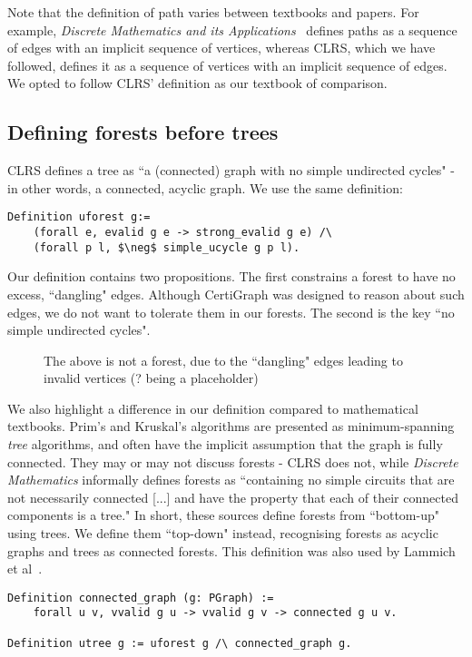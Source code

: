 Note that the definition of path varies between textbooks and papers. For example, \textit{Discrete Mathematics and its Applications}~\cite{rozen} defines paths as a sequence of edges with an implicit sequence of vertices, whereas CLRS, which we have followed, defines it as a sequence of vertices with an implicit sequence of edges. We opted to follow CLRS' definition as our textbook of comparison.

\subsection{Defining forests before trees}

CLRS defines a tree as ``a (connected) graph with no simple undirected cycles" - in other words, a connected, acyclic graph. We use the same definition:
\begin{lstlisting}
Definition uforest g:=
	(forall e, evalid g e -> strong_evalid g e) /\
	(forall p l, $\neg$ simple_ucycle g p l).
\end{lstlisting}
Our definition contains two propositions. The first constrains a forest to have no excess, ``dangling" edges. Although CertiGraph was designed to reason about such edges, we do not want to tolerate them in our forests. The second is the key ``no simple undirected cycles".
\begin{figure}[H]
	\caption{The above is not a forest, due to the ``dangling" edges leading to invalid vertices (? being a placeholder)}
\end{figure}
We also highlight a difference in our definition compared to mathematical textbooks. Prim's and Kruskal's algorithms are presented as minimum-spanning \textit{tree} algorithms, and often have the implicit assumption that the graph is fully connected. They may or may not discuss forests - CLRS does not, while \textit{Discrete Mathematics} informally defines forests as ``containing no simple circuits that are not necessarily connected [...] and have the property that each of their connected components is a tree." In short, these sources define forests from ``bottom-up" using trees. We define them ``top-down" instead, recognising forests as acyclic graphs and trees as connected forests. This definition was also used by Lammich et al~\cite{DBLP:journals/afp/LammichN19}.
\begin{lstlisting}
Definition connected_graph (g: PGraph) :=
	forall u v, vvalid g u -> vvalid g v -> connected g u v.

Definition utree g := uforest g /\ connected_graph g.
\end{lstlisting}
